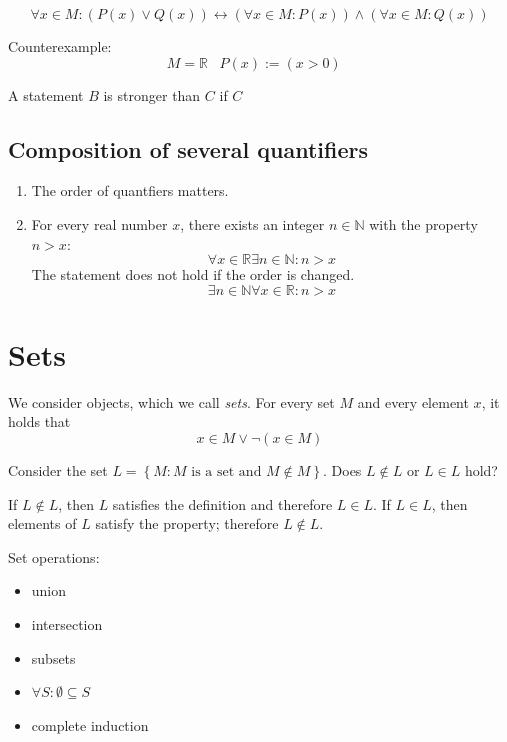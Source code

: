\documentclass[a4paper,landscape,twocolumn]{article}
\newcommand\set[1]{\left\{#1\right\}}
\begin{document}
\[ \forall x \in M: (P(x) \lor Q(x)) \leftrightarrow (\forall x \in M: P(x)) \land (\forall x \in M: Q(x)) \]

Counterexample:
\[ M = \mathbb{R} \hspace{10pt} P(x) := ( x > 0 ) \hspace{10pt} \]

A statement $B$ is stronger than $C$ if $C$

\subsection{Composition of several quantifiers}
%
\begin{enumerate}
  \item The order of quantfiers matters.
  \item
    For every real number $x$, there exists an integer $n \in \mathbb{N}$ with the property $n > x$:
    \[ \forall x \in \mathbb{R} \exists n \in \mathbb{N}: n > x \]
    The statement does not hold if the order is changed.
    \[ \exists n \in \mathbb{N} \forall x \in \mathbb{R}: n > x \]
\end{enumerate}

\section{Sets}
%
We consider objects, which we call \emph{sets}.
For every set $M$ and every element $x$, it holds that
\[ x \in M \lor \neg(x \in M) \]

Consider the set $L = \set{M: M \text{ is a set and } M \not\in M}$.
Does $L \not\in L$ or $L \in L$ hold?

If $L \not\in L$, then $L$ satisfies the definition and therefore $L \in L$.
If $L \in L$, then elements of $L$ satisfy the property; therefore $L \not\in L$.

Set operations:
\begin{itemize}
  \item union
  \item intersection
  \item subsets
  \item $\forall S: \emptyset \subseteq S$
  \item complete induction
\end{itemize}
\end{document}
